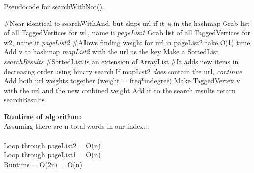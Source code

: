 \documentclass[12pt]{article}
\begin{document}
\begin{algorithm}[H]
\caption{Pseudocode for searchWithNot().}
\begin{algorithmic}
\State \#Near identical to searchWithAnd, but skips url if it \textit{is} in the hashmap
\State
\State Grab list of all TaggedVertices for w1, name it \textit{pageList1}
\State Grab list of all TaggedVertices for w2, name it \textit{pageList2}
\State 
\State \#Allows finding weight for url in pageList2 take O(1) time
\State Add v to hashmap \textit{mapList2} with the url as the key
\EndFor
\State Make a SortedList \textit{searchResults}
\State \#SortedList is an extension of ArrayList
\State \#It adds new items in decreasing order using binary search
\State 
{}
\State If mapList2 \textit{does} contain the url, \textit{continue}
\State 
\State Add both url weights together (weight = freq*indegree)
\State 
\State Make TaggedVertex v with the url and the new conbined weight
\State Add it to the search results
\EndFor
\State return searchResults
\end{algorithmic}
\end{algorithm}

\noindent \textbf{Runtime of algorithm:} \\
Assuming there are n total words in our index...\\\\
Loop through pageList2 = O(n)\\
Loop through pageList1 = O(n)\\
Runtime = O(2n) = O(n)
\end{document}
